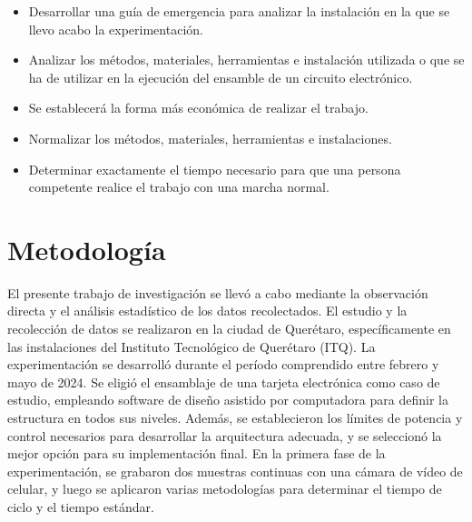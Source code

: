 
% 
%
\begin{itemize}
    \item Desarrollar una guía de emergencia para analizar la instalación en la que se llevo acabo la experimentación.
    \item Analizar los métodos, materiales, herramientas e instalación utilizada o que se ha de utilizar en la ejecución del ensamble de un circuito electrónico.
    \item Se establecerá la forma más económica de realizar el trabajo.
    \item Normalizar los métodos, materiales, herramientas e instalaciones.
    \item Determinar exactamente el tiempo necesario para que una persona competente realice el trabajo con una marcha normal.
\end{itemize} 
\section{Metodología}

El presente trabajo de investigación se llevó a cabo mediante la observación directa y el análisis estadístico de los datos recolectados.
El estudio y la recolección de datos se realizaron en la ciudad de Querétaro, específicamente en las instalaciones del Instituto Tecnológico de Querétaro (ITQ).
La experimentación se desarrolló durante el período comprendido entre febrero y mayo de 2024.
Se eligió el ensamblaje de una tarjeta electrónica como caso de estudio, empleando software de diseño asistido por computadora para definir la estructura en todos sus niveles. Además, se establecieron los límites de potencia y control necesarios para desarrollar la arquitectura adecuada, y se seleccionó la mejor opción para su implementación final. 
En la primera fase de la experimentación, se grabaron dos muestras continuas con una cámara de vídeo de celular, y luego se aplicaron varias metodologías para determinar el tiempo de ciclo y el tiempo estándar.


